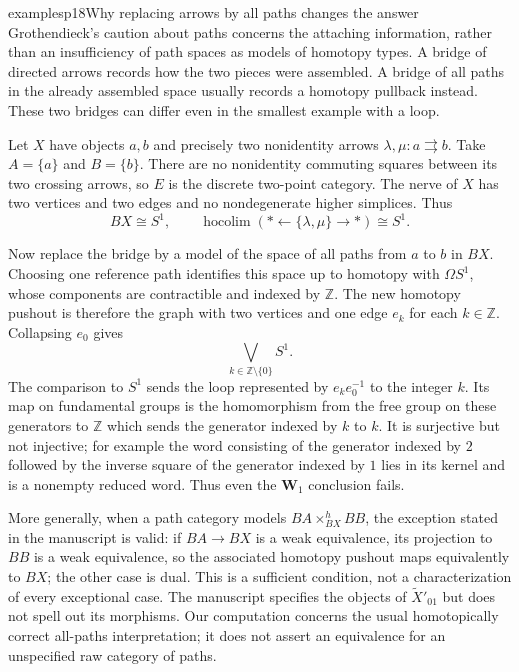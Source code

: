 \begin{dcomment}{examples}{p18}{Why replacing arrows by all paths changes the answer}
Grothendieck's caution about paths concerns the attaching information, rather than an insufficiency of path spaces as models of homotopy types. A bridge of directed arrows records how the two pieces were assembled. A bridge of all paths in the already assembled space usually records a homotopy pullback instead. These two bridges can differ even in the smallest example with a loop.

Let $X$ have objects $a,b$ and precisely two nonidentity arrows $\lambda,\mu:a\rightrightarrows b$. Take $A=\{a\}$ and $B=\{b\}$. There are no nonidentity commuting squares between its two crossing arrows, so $E$ is the discrete two-point category. The nerve of $X$ has two vertices and two edges and no nondegenerate higher simplices. Thus
\[
 BX\cong S^1,\qquad
 \operatorname{hocolim}(*\longleftarrow\{\lambda,\mu\}\longrightarrow*)
 \cong S^1.
\]

Now replace the bridge by a model of the space of all paths from $a$ to $b$ in $BX$. Choosing one reference path identifies this space up to homotopy with $\Omega S^1$, whose components are contractible and indexed by $\mathbb Z$. The new homotopy pushout is therefore the graph with two vertices and one edge $e_k$ for each $k\in\mathbb Z$. Collapsing $e_0$ gives
\[
 \bigvee_{k\in\mathbb Z\setminus\{0\}}S^1.
\]
The comparison to $S^1$ sends the loop represented by $e_ke_0^{-1}$ to the integer $k$. Its map on fundamental groups is the homomorphism from the free group on these generators to $\mathbb Z$ which sends the generator indexed by $k$ to $k$. It is surjective but not injective; for example the word consisting of the generator indexed by $2$ followed by the inverse square of the generator indexed by $1$ lies in its kernel and is a nonempty reduced word. Thus even the $\mathbf W_1$ conclusion fails.

More generally, when a path category models $BA\times^h_{BX}BB$, the exception stated in the manuscript is valid: if $BA\to BX$ is a weak equivalence, its projection to $BB$ is a weak equivalence, so the associated homotopy pushout maps equivalently to $BX$; the other case is dual. This is a sufficient condition, not a characterization of every exceptional case. The manuscript specifies the objects of $\widetilde X'_{01}$ but does not spell out its morphisms. Our computation concerns the usual homotopically correct all-paths interpretation; it does not assert an equivalence for an unspecified raw category of paths.
\end{dcomment}

